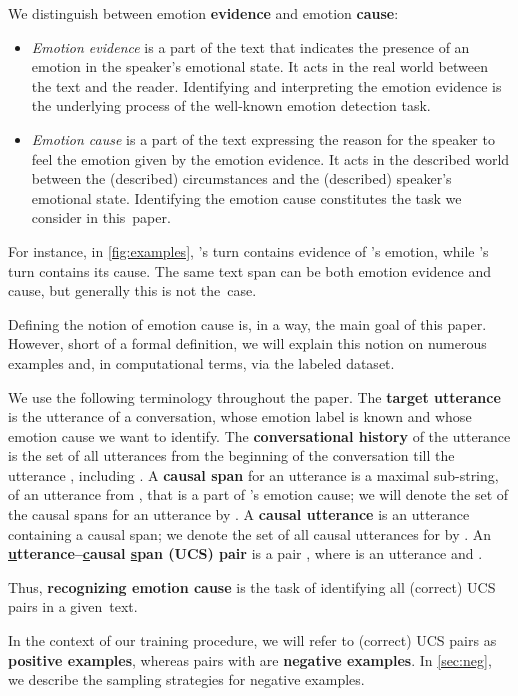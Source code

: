 \documentclass[smallextended]{svjour3}
\newcommand\0{\hphantom{0}}
\begin{document}
We distinguish between emotion \textbf{evidence} and emotion \textbf{cause}:
\begin{itemize}[itemsep=0ex,leftmargin=*]
    \item \textit{Emotion evidence} is a part of the text that indicates the presence of an emotion in the speaker's emotional state. It acts in the real world between the text and the reader. 
Identifying and interpreting the emotion evidence is the underlying process of the well-known emotion detection task. 
    
    \item \textit{Emotion cause} is a part of the text expressing the reason for the speaker to feel the emotion given by the emotion evidence. It acts in the 
described world
    between the (described) circumstances and the (described) speaker's emotional state. Identifying the emotion cause constitutes the task we consider in this~paper.
\end{itemize}
For instance, in \cref{fig:examples}, 's turn contains evidence of 's emotion, while 's turn contains its cause.
The same text span can be both emotion evidence and cause, but generally this is not the~case.

Defining the notion of emotion cause is, in a way, the main goal of this paper. However, short of a formal definition, we will explain this notion on numerous examples and, in computational terms, via the labeled dataset. 


We use the following terminology throughout the paper. 
The \textbf{target utterance}  is the  utterance of a conversation, whose emotion label  is known and whose emotion cause we want to identify.
The \textbf{conversational history}  of the utterance  is the set of all utterances from the beginning of the conversation till the utterance , including .
A \textbf{causal span} for an utterance  is a maximal sub-string, of an utterance from , that is a part of 's emotion cause; we will denote the set of the causal spans for an utterance  by .
A \textbf{causal utterance} is an utterance containing a causal span; we denote the set of all causal utterances for  by .
An \textbf{\underline utterance--\underline causal \underline span (UCS) pair} is a pair , where  is an utterance and .

Thus, \textbf{recognizing emotion cause} is the task of identifying all (correct) UCS pairs in a given~text.

In the context of our training procedure, we will refer to (correct) UCS pairs as \textbf{positive 
examples}, whereas pairs  with  are  \textbf{negative
examples}.
In \cref{sec:neg}, we describe the sampling strategies for negative examples.
\end{document}
